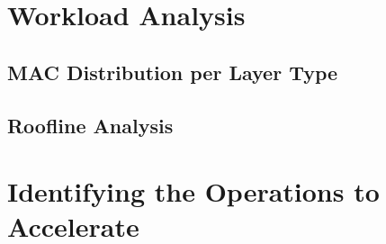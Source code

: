 \section{Workload Analysis}
\label{sec:workload}

\subsection{MAC Distribution per Layer Type}
\label{sec:mac-dist}

\subsection{Roofline Analysis}
\label{sec:roofline-analysis}

\section{Identifying the Operations to Accelerate}
\label{sec:what-to-accelerate}
